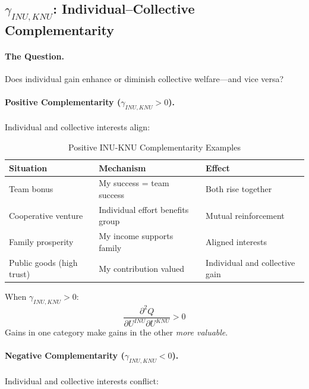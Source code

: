 \subsection{$\gamma_{INU,KNU}$: Individual--Collective Complementarity}

\paragraph{The Question.}
Does individual gain enhance or diminish collective welfare---and vice versa?

\paragraph{Positive Complementarity ($\gamma_{INU,KNU} > 0$).}
Individual and collective interests align:

\begin{table}[htbp]
\centering
\caption{Positive INU-KNU Complementarity Examples}
\label{tab:app-c-inu-knu-positive}
\renewcommand{\arraystretch}{1.3}
\begin{tabular}{@{}lll@{}}
\toprule
\textbf{Situation} & \textbf{Mechanism} & \textbf{Effect} \\
\midrule
Team bonus & My success = team success & Both rise together \\
Cooperative venture & Individual effort benefits group & Mutual reinforcement \\
Family prosperity & My income supports family & Aligned interests \\
Public goods (high trust) & My contribution valued & Individual and collective gain \\
\bottomrule
\end{tabular}
\end{table}

When $\gamma_{INU,KNU} > 0$:
\begin{equation}
\frac{\partial^2 Q}{\partial U^{INU} \partial U^{KNU}} > 0
\end{equation}
Gains in one category make gains in the other \emph{more valuable}.

\paragraph{Negative Complementarity ($\gamma_{INU,KNU} < 0$).}
Individual and collective interests conflict:

